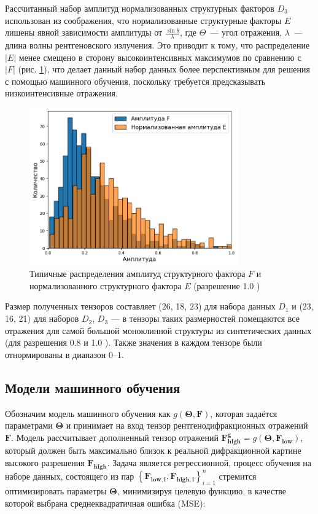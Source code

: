 Рассчитанный набор амплитуд нормализованных структурных факторов $D_3$ использован из соображения, что нормализованные структурные факторы $E$ лишены явной зависимости амплитуды от $\frac{\sin \theta}{\lambda}$, где $\Theta$~--- угол отражения, $\lambda$~--- длина волны рентгеновского излучения. Это приводит к тому, что распределение $|E|$ менее смещено в сторону высокоинтенсивных максимумов по сравнению
 с $|F|$ (рис. \ref{amplfehist}), что делает данный набор данных более перспективным для решения с помощью машинного обучения, поскольку требуется предсказывать низкоинтенсивные отражения.
 
\begin{figure}[H]
			\centering
            \includegraphics[width=0.8\textwidth]{figures/amplfehist.png}
            \caption{Типичные распределения амплитуд структурного фактора $F$ и нормализованного структурного фактора $E$ (разрешение 1.0 \angstrom)}
            \label{amplfehist}
\end{figure}

Размер полученных тензоров составляет (26, 18, 23) для набора данных $D_1$ и (23, 16, 21) для наборов $D_2$, $D_3$ --- в тензоры таких размерностей помещаются все отражения для самой большой моноклинной структуры из синтетических данных (для разрешения 0.8 \angstrom и 1.0 \angstrom). Также значения в каждом тензоре были отнормированы в диапазон 0--1.

 

\subsection{Модели машинного обучения}

Обозначим модель машинного обучения как $g(\mathbf{\Theta}, \mathbf{F})$, которая задаётся параметрами $\mathbf{\Theta}$ и принимает на вход тензор рентгенодифракционных отражений $\mathbf{F}$. Модель рассчитывает дополненный тензор отражений $\mathbf{F_{high}^g} = g(\mathbf{\Theta}, \mathbf{F_{low}})$, который должен быть максимально близок к реальной дифракционной картине высокого разрешения $\mathbf{F_{high}}$. Задача является регрессионной, процесс обучения на наборе данных, состоящего из пар $\left\lbrace\mathbf{F_{low, i}, F_{high, i}}\right\rbrace^n_{i=1}$ стремится оптимизировать параметры $\mathbf{\Theta}$, минимизируя целевую функцию, в качестве которой выбрана среднеквадратичная ошибка (MSE):

